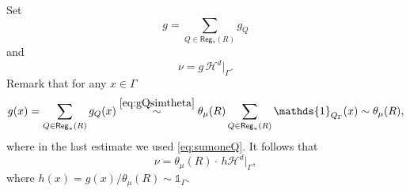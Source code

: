 \documentclass[11pt,reqno]{amsart}
\newcommand{\Tr}{\mathrm{Tree}}
\def\one{\mathds{1}}
\theoremstyle{definition}
\theoremstyle{remark}
\newtheorem{remark}[theorem]{Remark}
\numberwithin{equation}{section}
\newcommand{\hd}{\mathcal{H}^d}
\newcommand{\Reg}{\mathsf{Reg}_*}
\theoremstyle{theorem}
\theoremstyle{definition}
\theoremstyle{remark}
\numberwithin{equation}{section}
\begin{document}
	Set
	\begin{equation*}
	g=\sum_{Q\in\Reg(R)}g_Q
	\end{equation*}
	and
	\begin{equation}\label{eq:nu-def}
	\nu = g\,\hd|_\Gamma.
	\end{equation}
	Remark that for any $x\in\Gamma$
	\begin{equation*}
		g(x) = \sum_{Q\in\Reg(R)} g_Q(x) \overset{\eqref{eq:gQsimtheta}}{\sim} \theta_\mu(R)\sum_{Q\in\Reg(R)} \one_{Q_\Gamma}(x)\sim \theta_\mu(R),
	\end{equation*}
	where in the last estimate we used \eqref{eq:sumoneQ}. It follows that
	\begin{equation}\label{eq:nuGammarel}
	\nu=  \theta_\mu(R)\cdot\, h\hd|_\Gamma,
	\end{equation}
	where $h(x)=g(x)/\theta_\mu(R)\sim \one_\Gamma$.


 
	
\end{document}
